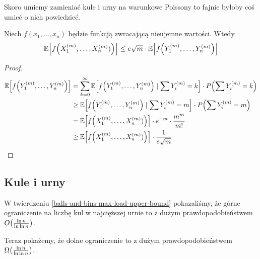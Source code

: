 Skoro umiemy zamieniać kule i urny na warunkowe Poissony to fajnie byłoby coś umieć o nich powiedzieć.

\begin{theorem}
	\label{poisson-approximation-for-any-function}
	Niech \( f(x_1, \dots, x_n) \) będzie funkcją zwracającą nieujemne wartości. Wtedy
	\[
		\expected{f\pars{X_1^{(m)}, \dots, X_n^{(m)})}} \leq e\sqrt{m} \cdot \expected{f\pars{Y_1^{(m)}, \dots, Y_n^{(m)}}}
	\]
\end{theorem}
\begin{proof}
	\begin{align*}
		\expected{f\pars{Y_1^{(m)}, \dots, Y_n^{(m)}}}
		 & = \sum_{k=0}^\infty \expected{f\pars{Y_1^{(m)}, \dots, Y_n^{(m)}} \mid \sum Y_i^{(m)} = k} \cdot P\pars{\sum Y_i^{(m)} = k} \\
		 & \geq \expected{f\pars{Y_1^{(m)}, \dots, Y_n^{(m)}} \mid \sum Y_i^{(m)} = m} \cdot P\pars{\sum Y_i^{(m)} = m}                \\
		 & = \expected{f\pars{X_1^{(m)}, \dots, X_n^{(m)})}} \cdot e^{-m} \cdot \frac{m^m}{m!}                                         \\
		 & \geq \expected{f\pars{X_1^{(m)}, \dots, X_n^{(m)})}} \cdot \frac{1}{e\sqrt{m}}
	\end{align*}
\end{proof}

\subsection{Kule i urny}
W twierdzeniu \ref{balls-and-bins-max-load-upper-bound} pokazaliśmy, że górne ograniczenie na liczbę kul w najcięższej urnie to z dużym prawdopodobieństwem \( O\pars{\frac{\ln n}{\ln \ln n}} \).

Teraz pokażemy, że dolne ograniczenie to z dużym prawdopodobieństwem \( \Omega\pars{\frac{\ln n}{\ln \ln n}} \).

